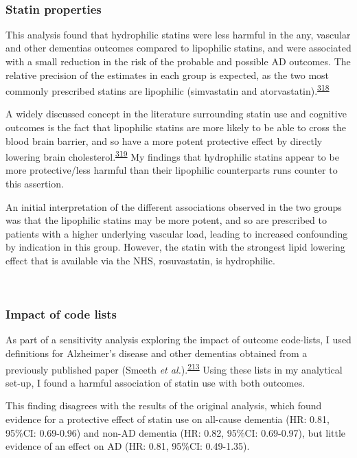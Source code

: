 \documentclass[a4paper, twoside]{templates/ociamthesis}
\begin{document}
~

\hypertarget{statin-properties-2}{%
\subsubsection{Statin properties}\label{statin-properties-2}}

This analysis found that hydrophilic statins were less harmful in the any, vascular and other dementias outcomes compared to lipophilic statins, and were associated with a small reduction in the risk of the probable and possible AD outcomes. The relative precision of the estimates in each group is expected, as the two most commonly prescribed statins are lipophilic (simvastatin and atorvastatin).\textsuperscript{\protect\hyperlink{ref-newman2019}{318}}

A widely discussed concept in the literature surrounding statin use and cognitive outcomes is the fact that lipophilic statins are more likely to be able to cross the blood brain barrier, and so have a more potent protective effect by directly lowering brain cholesterol.\textsuperscript{\protect\hyperlink{ref-shepardson2011}{319}} My findings that hydrophilic statins appear to be more protective/less harmful than their lipophilic counterparts runs counter to this assertion.

An initial interpretation of the different associations observed in the two groups was that the lipophilic statins may be more potent, and so are prescribed to patients with a higher underlying vascular load, leading to increased confounding by indication in this group. However, the statin with the strongest lipid lowering effect that is available via the NHS, rosuvastatin, is hydrophilic.

~

\hypertarget{impact-of-code-lists}{%
\subsubsection{Impact of code lists}\label{impact-of-code-lists}}

As part of a sensitivity analysis exploring the impact of outcome code-lists, I used definitions for Alzheimer's disease and other dementias obtained from a previously published paper (Smeeth \emph{et al.}).\textsuperscript{\protect\hyperlink{ref-smeeth2009}{213}} Using these lists in my analytical set-up, I found a harmful association of statin use with both outcomes.

This finding disagrees with the results of the original analysis, which found evidence for a protective effect of statin use on all-cause dementia (HR: 0.81, 95\%CI: 0.69-0.96) and non-AD dementia (HR: 0.82, 95\%CI: 0.69-0.97), but little evidence of an effect on AD (HR: 0.81, 95\%CI: 0.49-1.35).
\end{document}
